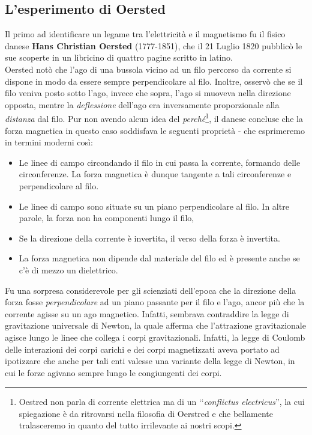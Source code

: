 \subsection{L'esperimento di Oersted}
Il primo ad identificare un legame tra l'elettricità e il magnetismo fu il fisico danese \textbf{Hans Christian Oersted} (1777-1851), che il 21 Luglio 1820 pubblicò le sue scoperte in un libricino di quattro pagine scritto in latino.\\
Oersted notò che l'ago di una bussola vicino ad un filo percorso da corrente si dispone in modo da essere sempre perpendicolare al filo. Inoltre, osservò che se il filo veniva posto sotto l'ago, invece che sopra, l'ago si muoveva nella direzione opposta, mentre la \textit{deflessione} dell'ago era inversamente proporzionale alla \textit{distanza} dal filo.
Pur non avendo alcun idea del \textit{perché}\footnote{Oestred non parla di corrente elettrica ma di un ‘‘\textit{conflictus electricus}'', la cui spiegazione è da ritrovarsi nella filosofia di Oerstred e che bellamente tralasceremo in quanto del tutto irrilevante ai nostri scopi.}, il danese concluse che la forza magnetica in questo caso soddisfava le seguenti proprietà - che esprimeremo in termini moderni così: %
\begin{itemize}
	\item Le linee di campo circondando il filo in cui passa la corrente, formando delle circonferenze. La forza magnetica è dunque tangente a tali circonferenze e perpendicolare al filo.
	\item Le linee di campo sono situate su un piano perpendicolare al filo. In altre parole, la forza non ha componenti lungo il filo,
	\item Se la direzione della corrente è invertita, il verso della forza è invertita.
	\item La forza magnetica non dipende dal materiale del filo ed è presente anche se c'è di mezzo un dielettrico.
\end{itemize} 
\begin{digression}
	Fu una sorpresa considerevole per gli scienziati dell'epoca che la direzione della forza fosse \textit{perpendicolare} ad un piano passante per il filo e l'ago, ancor più che la corrente agisse su un ago magnetico. Infatti, sembrava contraddire la legge di gravitazione universale di Newton, la quale afferma che l'attrazione gravitazionale agisce lungo le linee che collega i corpi gravitazionali. Infatti, la legge di Coulomb delle interazioni dei corpi carichi e dei corpi magnetizzati aveva portato ad ipotizzare che anche per tali enti valesse una variante della legge di Newton, in cui le forze agivano sempre lungo le congiungenti dei corpi.
\end{digression}

